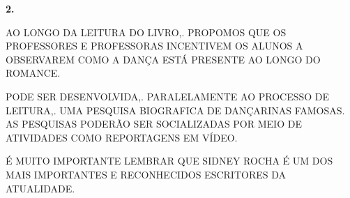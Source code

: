 \documentclass[12pt]{extarticle}
\begin{document}





\textbf{2. }

AO LONGO DA LEITURA DO LIVRO,. PROPOMOS QUE OS PROFESSORES E PROFESSORAS
  INCENTIVEM OS ALUNOS A OBSERVAREM COMO A DANÇA ESTÁ PRESENTE AO LONGO DO
  ROMANCE.
 
PODE SER DESENVOLVIDA,. PARALELAMENTE AO PROCESSO DE LEITURA,. UMA PESQUISA
  BIOGRAFICA DE DANÇARINAS FAMOSAS. AS PESQUISAS PODERÃO SER SOCIALIZADAS POR
  MEIO DE ATIVIDADES COMO REPORTAGENS EM VÍDEO.
 
É MUITO IMPORTANTE LEMBRAR QUE SIDNEY ROCHA É UM DOS MAIS IMPORTANTES E
  RECONHECIDOS ESCRITORES DA ATUALIDADE.
 
\end{document}

